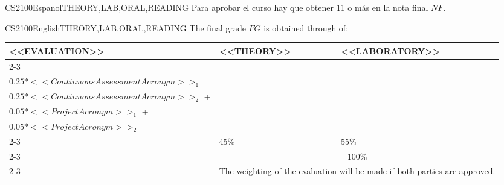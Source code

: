 \begin{evaluation}{CS2100}{Espanol}{THEORY,LAB,ORAL,READING}
  \noindent Para aprobar el curso hay que obtener 11 o más en la nota final $NF$.
  \end{evaluation}
 
  \begin{evaluation}{CS2100}{English}{THEORY,LAB,ORAL,READING}
  The final grade $FG$ is obtained through of:
 
  \begin{tabularx}{0.9\textwidth}{|X|p{}|p{}|} \hline
    \multirow{4}{*}{\uppercase{<<Evaluation>>}} & \uppercase{<<Theory>>} & \uppercase{<<Laboratory>>} \\ \cline{2-3}
    & %
        \begin{minipage}{0.95\textwidth}
        \begin{tabular}{l}
            $0.20*<<ExamAcronym>>_{1}$  + \\
            $0.25*<<ContinuousAssessmentAcronym>>_{1}$
            \end{tabular} 
        \end{minipage} 
    & %
        \begin{minipage}{0.95\textwidth}
        \begin{tabular}{l}
            $0.20*<<ExamAcronym>>_{1}$  + \\
            $0.25*<<ContinuousAssessmentAcronym>>_{2}$  +\\
            $0.05*<<ProjectAcronym>>_{1}$ + \\
            $0.05*<<ProjectAcronym>>_{2}$
            \end{tabular} 
        \end{minipage}                 \\ \cline{2-3}
    
    & %
    45\% 
    & %
    55\% \\ \cline{2-3}
    & \multicolumn{2}{|c|}{100\%} \\ \cline{2-3}
    & \multicolumn{2}{|c|}{The weighting of the evaluation will be made if both parties are approved.}  \\ \hline
    \end{tabularx}
    

\end{evaluation}
